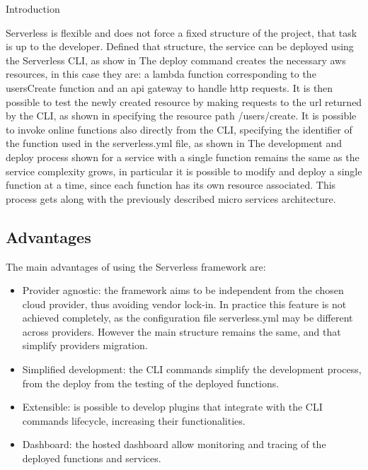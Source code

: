 \begin{chapter}{Introduction}


    Serverless is flexible and does not force a fixed structure of the project, that
    task is up to the developer.
    Defined that structure, the service can be deployed using the Serverless CLI, as
    show in %
    The deploy command creates the necessary aws resources, in this case they are:
    a lambda function corresponding to the usersCreate function and an api gateway to
    handle http requests.
    It is then possible to test the newly created resource by making requests to the
    url returned by the CLI, as shown in %
    specifying the resource path /users/create.
    It is possible to invoke online functions also directly from the CLI,
    specifying the identifier of the function used in the serverless.yml file, as shown in %
    The development and deploy process shown for a service with a single function
    remains the same as the service complexity grows, in particular it is possible to
    modify and deploy a single function at a time, since each function has its own
    resource associated.
    This process gets along with the previously described micro services architecture.

    \subsection{Advantages}
    The main advantages of using the Serverless framework are:
    \begin{itemize}
        \item Provider agnostic: the framework aims to be independent from the chosen
            cloud provider, thus avoiding vendor lock-in. In practice this feature is
            not achieved completely, as the configuration file serverless.yml may be
            different across providers. However the main structure remains the same,
            and that simplify providers migration.
        \item Simplified development: the CLI commands simplify the development process,
            from the deploy from the testing of the deployed functions.
        \item Extensible: is possible to develop plugins that integrate with the
            CLI commands lifecycle, increasing their functionalities.
        \item Dashboard: the hosted dashboard allow monitoring and tracing of the
            deployed functions and services.
    \end{itemize}


\end{chapter}
